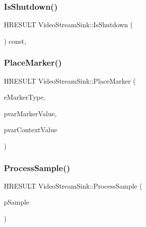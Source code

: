 \mbox{\label{class_video_stream_sink_a808bf294e945cf804eca5ed9b5e3a260}} 
\subsubsection{\texorpdfstring{Is\+Shutdown()}{IsShutdown()}}
{\footnotesize\ttfamily H\+R\+E\+S\+U\+LT Video\+Stream\+Sink\+::\+Is\+Shutdown (\begin{DoxyParamCaption}{ }\end{DoxyParamCaption}) const\hspace{0.3cm}{\ttfamily [inline]}, {\ttfamily [private]}}

\mbox{\label{class_video_stream_sink_a58bdb0f2bd7619386b4d31fc6121a6ef}} 
\subsubsection{\texorpdfstring{Place\+Marker()}{PlaceMarker()}}
{\footnotesize\ttfamily H\+R\+E\+S\+U\+LT Video\+Stream\+Sink\+::\+Place\+Marker (\begin{DoxyParamCaption}\item[{M\+F\+S\+T\+R\+E\+A\+M\+S\+I\+N\+K\+\_\+\+M\+A\+R\+K\+E\+R\+\_\+\+T\+Y\+PE}]{e\+Marker\+Type,  }\item[{const P\+R\+O\+P\+V\+A\+R\+I\+A\+NT $\ast$}]{pvar\+Marker\+Value,  }\item[{const P\+R\+O\+P\+V\+A\+R\+I\+A\+NT $\ast$}]{pvar\+Context\+Value }\end{DoxyParamCaption})\hspace{0.3cm}{\ttfamily [override]}}

\mbox{\label{class_video_stream_sink_af96e8b969c8eedfc1d04e4be75960868}} 
\subsubsection{\texorpdfstring{Process\+Sample()}{ProcessSample()}}
{\footnotesize\ttfamily H\+R\+E\+S\+U\+LT Video\+Stream\+Sink\+::\+Process\+Sample (\begin{DoxyParamCaption}\item[{I\+M\+F\+Sample $\ast$}]{p\+Sample }\end{DoxyParamCaption})\hspace{0.3cm}{\ttfamily [override]}}

